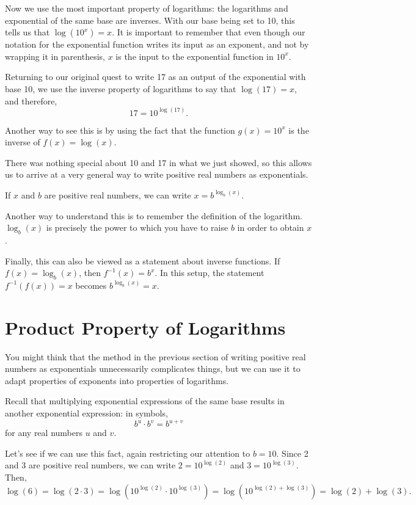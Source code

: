 \documentclass[nooutcomes]{ximera}
\begin{document}
Now we use the most important property of logarithms: the logarithms and exponential of the same base are inverses. With our base being set to 10, this tells us that $\log(10^x) = x$. It is important to remember that even though our notation for the exponential function writes its input as an exponent, and not by wrapping it in parenthesis, $x$ is the input to the exponential function in $10^x$. 

Returning to our original quest to write 17 as an output of the exponential with base 10, we use the inverse property of logarithms to say that $\log(17) = x$, and therefore, 
$$
17 = 10^{\log(17)}.
$$

Another way to see this is by using the fact that the function $g(x) = 10^x$ is the inverse of $f(x) = \log(x)$. 

There was nothing special about 10 and 17 in what we just showed, so this allows us to arrive at a very general way to write positive real numbers as exponentials. 

\begin{callout}
If $x$ and $b$ are positive real numbers, we can write $x = b^{\log_b(x)}$.
\end{callout}
  
Another way to understand this is to remember the definition of the logarithm. $\log_b(x)$ is precisely the power to which you have to raise $b$ in order to obtain $x$. 

Finally, this can also be viewed as a statement about inverse functions. If $f(x) = \log_b(x)$, then $f^{-1}(x) = b^x$. In this setup, the statement $f^{-1}(f(x)) = x$ becomes $b^{\log_b(x)} = x$. 

\section{Product Property of Logarithms}
You might think that the method in the previous section of writing positive real numbers as exponentials unnecessarily complicates things, but we can use it to adapt properties of exponents into properties of logarithms. 

Recall that multiplying exponential expressions of the same base results in another exponential expression: in symbols, $$b^u \cdot b^v = b^{u + v}$$ for any real numbers $u$ and $v$. 

Let's see if we can use this fact, again restricting our attention to $b = 10$. Since 2 and 3 are positive real numbers, we can write $2 = 10^{\log(2)}$ and $3 = 10^{\log(3)}$. Then,
$$
\log(6) = \log(2\cdot 3) = \log(10^{\log(2)} \cdot 10^{\log(3)}) = \log(10^{\log(2) + \log(3)}) = \log(2) + \log(3).
$$
\end{document}

